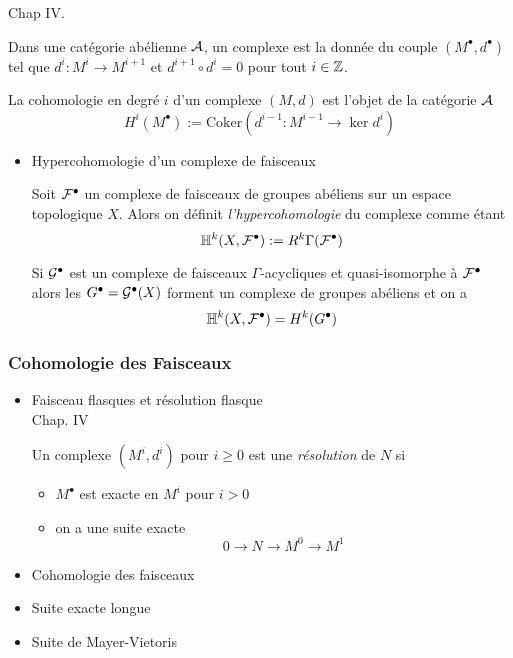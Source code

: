 \documentclass[12pt,makeidx]{amsart}
\begin{document}
\cite{Demailly} Chap IV.
\cite{Voisin}

Dans une catégorie abélienne $\mathcal{A}$, un complexe est la donnée du couple $(M^\bullet, d^\bullet)$ tel que $d^i : M^i \to M^{i+1}$ et $d^{i+1} \circ d^i = 0$ pour tout $i \in \mathbb{Z}$.

La cohomologie en degré $i$ d'un complexe $(M,d)$ est l'objet de la catégorie $\mathcal{A}$
\[
H^i(M^\bullet) := \text{Coker}\left( d^{i-1}: M^{i-1} \to \ker d^i\right)
\]
\begin{itemize}

\item Hypercohomologie d'un complexe de faisceaux\\
\label{sec-1-2-1-1}%
\cite{Voisin}

Soit $\mathcal{F}^\bullet$ un complexe de faisceaux de groupes abéliens sur un espace topologique $X$. Alors on définit \textit{l'hypercohomologie} du complexe comme étant
\[
\mathbb{H}^{k}(X,\mathcal{F}^\bullet) := R^k\Gamma(\mathcal{F}^\bullet)
\]

Si $\mathcal{G}^\bullet$ est un complexe de faisceaux $\Gamma$-acycliques et quasi-isomorphe à $\mathcal{F}^\bullet$ alors
les $G^\bullet = \mathcal{G}^\bullet(X)$ forment un complexe de groupes abéliens
et on a
\[
\mathbb{H}^k(X,\mathcal{F}^\bullet) = H^k(G^\bullet)
\]
\end{itemize} %
\subsubsection{Cohomologie des Faisceaux}
\label{sec-1-2-2}
\begin{itemize}

\item Faisceau flasques et résolution flasque\\
\label{sec-1-2-2-1}%
\cite{Demailly} Chap. IV


\cite{Voisin}
Un complexe $(M^i,d^i)$ pour $i\geq 0$ est une \textit{résolution}  de $N$ si 
\begin{itemize}
\item $M^\bullet$ est exacte en $M^i$ pour $i>0$
\item on a une suite exacte
  \[
  0 \to N \to M^0 \to M^1
  \]
\end{itemize}


\item Cohomologie des faisceaux
\label{sec-1-2-2-2}%

\item Suite exacte longue
\label{sec-1-2-2-3}%

\item Suite de Mayer-Vietoris
\label{sec-1-2-2-4}%
\end{itemize} %
\end{document}
